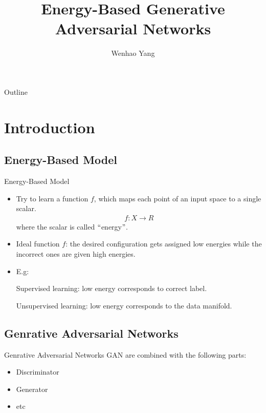 \documentclass[mathserif]{beamer}
\begin{document}
\title{Energy-Based Generative Adversarial Networks}

\author{Wenhao Yang
}
\begin{frame}
  \titlepage
\end{frame}

\date{}

\begin{frame}{Outline}
\tableofcontents
\end{frame}
\section{Introduction}
\subsection{Energy-Based Model}
\begin{frame}{Energy-Based Model}
\begin{itemize}
  \item Try to learn a function $f$, which maps each point of an input space to a single scalar.
  \begin{align}
    f: X\rightarrow R
  \end{align}
  where the scalar is called $``$energy$"$.
\end{itemize}
\begin{itemize}
  \item Ideal function $f$: the desired configuration gets assigned low energies while
  the incorrect ones are given high energies.
\end{itemize}
\begin{itemize}
  \item E.g:

  Supervised learning: low energy corresponds to correct label.

  Unsupervised learning: low energy corresponds to the data manifold.
\end{itemize}
\end{frame}
\subsection{Genrative Adversarial Networks}
\begin{frame}{Genrative Adversarial Networks}
GAN are combined with the following parts:
\begin{itemize}
  \item Discriminator
  \item Generator
  \item etc
\end{itemize}
\end{frame}
\end{document}
